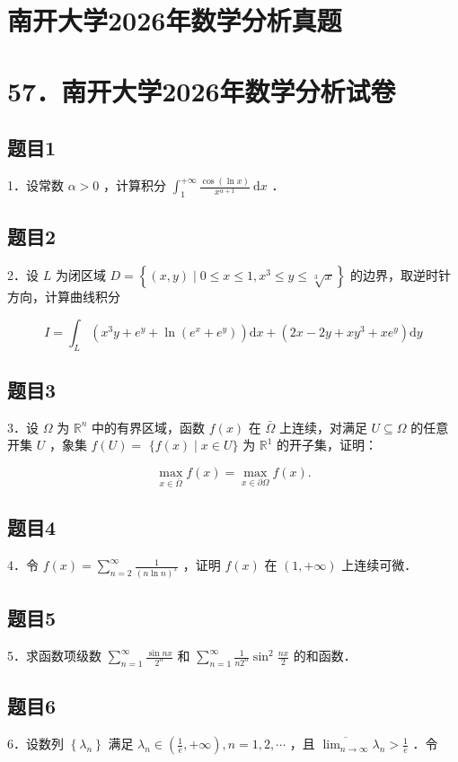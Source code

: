 \documentclass{article}
\begin{document}
\section*{南开大学2026年数学分析真题}
\section*{57．南开大学2026年数学分析试卷}

\subsection{题目1}
1．设常数 \(\alpha>0\) ，计算积分 \(\int_{1}^{+\infty} \frac{\cos (\ln x)}{x^{\alpha+1}} \mathrm{~d} x\) ．

\subsection{题目2}
2．设 \(L\) 为闭区域 \(D=\left\{(x, y) \mid 0 \leq x \leq 1, x^{3} \leq y \leq \sqrt[3]{x}\right\}\) 的边界，取逆时针方向，计算曲线积分

\[
I=\int_{L}\left(x^{3} y+e^{y}+\ln \left(e^{x}+e^{y}\right)\right) \mathrm{d} x+\left(2 x-2 y+x y^{3}+x e^{y}\right) \mathrm{d} y
\]

\subsection{题目3}
3．设 \(\Omega\) 为 \(\mathbb{R}^{n}\) 中的有界区域，函数 \(f(x)\) 在 \(\bar{\Omega}\) 上连续，对满足 \(U \subseteq \Omega\) 的任意开集 \(U\) ，象集 \(f(U)=\) \(\{f(x) \mid x \in U\}\) 为 \(\mathbb{R}^{1}\) 的开子集，证明：

\[
\max _{x \in \bar{\Omega}} f(x)=\max _{x \in \partial \Omega} f(x) .
\]

\subsection{题目4}
4．令 \(f(x)=\sum_{n=2}^{\infty} \frac{1}{(n \ln n)^{x}}\) ，证明 \(f(x)\) 在 \((1,+\infty)\) 上连续可微．

\subsection{题目5}
5．求函数项级数 \(\sum_{n=1}^{\infty} \frac{\sin n x}{2^{n}}\) 和 \(\sum_{n=1}^{\infty} \frac{1}{n 2^{n}} \sin ^{2} \frac{n x}{2}\) 的和函数．

\subsection{题目6}
6．设数列 \(\left\{\lambda_{n}\right\}\) 满足 \(\lambda_{n} \in\left(\frac{1}{e},+\infty\right), n=1,2, \cdots\) ，且 \(\overline{\lim _{n \rightarrow \infty}} \lambda_{n}>\frac{1}{e}\) ．令
\end{document}
